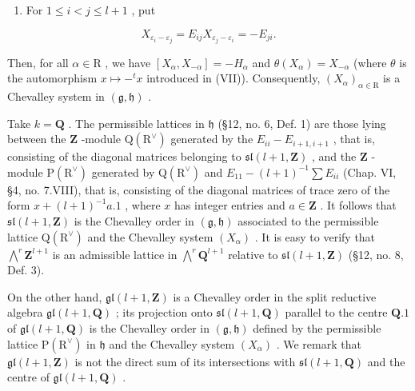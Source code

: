 \begin{enumerate}
\def\labelenumi{(\Roman{enumi})}
\setcounter{enumi}{8}
\tightlist
\item
  For \(1 \leq i < j \leq l + 1\) , put
\end{enumerate}

\[
X _ {\varepsilon_ {i} - \varepsilon_ {j}} = E _ {i j} X _ {\varepsilon_ {j} - \varepsilon_ {i}} = - E _ {j i}.
\]

Then, for all \(\alpha \in \mathrm{R}\) , we have \([X_{\alpha}, X_{-\alpha}] = -H_{\alpha}\) and \(\theta(X_{\alpha}) = X_{-\alpha}\) (where \(\theta\) is the automorphism \(x \mapsto -^{t} x\) introduced in (VII)). Consequently, \((X_{\alpha})_{\alpha \in \mathrm{R}}\) is a Chevalley system in \((\mathfrak{g}, \mathfrak{h})\) .

Take \(k = \mathbf{Q}\) . The permissible lattices in \(\mathfrak{h}\) (§12, no. 6, Def. 1) are those lying between the \(\mathbf{Z}\) -module \(\mathrm{Q}(\mathrm{R}^{\vee})\) generated by the \(E_{ii} - E_{i+1,i+1}\) , that is, consisting of the diagonal matrices belonging to \(\mathfrak{sl}(l+1,\mathbf{Z})\) , and the \(\mathbf{Z}\) -module \(\mathrm{P}(\mathrm{R}^{\vee})\) generated by \(\mathrm{Q}(\mathrm{R}^{\vee})\) and \(E_{11} - (l+1)^{-1}\sum E_{ii}\) (Chap. VI, §4, no. 7.VIII), that is, consisting of the diagonal matrices of trace zero of the form \(x + (l+1)^{-1}a.1\) , where \(x\) has integer entries and \(a\in\mathbf{Z}\) . It follows that \(\mathfrak{sl}(l+1,\mathbf{Z})\) is the Chevalley order in \((\mathfrak{g},\mathfrak{h})\) associated to the permissible lattice \(\mathrm{Q}(\mathrm{R}^{\vee})\) and the Chevalley system \((X_{\alpha})\) . It is easy to verify that \(\bigwedge^{r}\mathbf{Z}^{l+1}\) is an admissible lattice in \(\bigwedge^{r}\mathbf{Q}^{l+1}\) relative to \(\mathfrak{sl}(l+1,\mathbf{Z})\) (§12, no. 8, Def. 3).

On the other hand, \(\mathfrak{gl}(l+1,\mathbf{Z})\) is a Chevalley order in the split reductive algebra \(\mathfrak{gl}(l+1,\mathbf{Q})\) ; its projection onto \(\mathfrak{sl}(l+1,\mathbf{Q})\) parallel to the centre \(\mathbf{Q}.1\) of \(\mathfrak{gl}(l+1,\mathbf{Q})\) is the Chevalley order in \((\mathfrak{g},\mathfrak{h})\) defined by the permissible lattice \(\mathrm{P}(\mathrm{R}^{\vee})\) in \(\mathfrak{h}\) and the Chevalley system \((X_{\alpha})\) . We remark that \(\mathfrak{gl}(l+1,\mathbf{Z})\) is not the direct sum of its intersections with \(\mathfrak{sl}(l+1,\mathbf{Q})\) and the centre of \(\mathfrak{gl}(l+1,\mathbf{Q})\) .